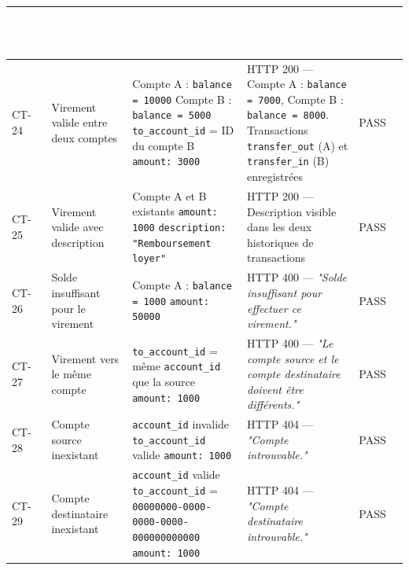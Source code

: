 \documentclass[12pt,a4paper,landscape]{article}
\begin{document}
\begin{longtable}{|L{2cm}|L{5cm}|L{6.5cm}|L{5cm}|L{2.5cm}|}
\hline
{}
\textbf{\textcolor{white}{Test Case ID}} &
\textbf{\textcolor{white}{Test Case Description}} &
\textbf{\textcolor{white}{Test Input (Test Case Value)}} &
\textbf{\textcolor{white}{Expected Results}} &
\textbf{\textcolor{white}{Test Case Status}} \\
\hline
CT-24 &
Virement valide entre deux comptes &
Compte A : \texttt{balance = 10000} \newline Compte B : \texttt{balance = 5000} \newline \texttt{to\_account\_id} = ID du compte B \newline \texttt{amount: 3000} &
HTTP 200 — Compte A : \texttt{balance = 7000}, Compte B : \texttt{balance = 8000}. \newline Transactions \texttt{transfer\_out} (A) et \texttt{transfer\_in} (B) enregistrées &
PASS \\
\hline
{}
CT-25 &
Virement valide avec description &
Compte A et B existants \newline \texttt{amount: 1000} \newline \texttt{description: "Remboursement loyer"} &
HTTP 200 — Description visible dans les deux historiques de transactions &
PASS \\
\hline
CT-26 &
Solde insuffisant pour le virement &
Compte A : \texttt{balance = 1000} \newline \texttt{amount: 50000} &
HTTP 400 — \textit{"Solde insuffisant pour effectuer ce virement."} &
PASS \\
\hline
{}
CT-27 &
Virement vers le même compte &
\texttt{to\_account\_id} = même \texttt{account\_id} que la source \newline \texttt{amount: 1000} &
HTTP 400 — \textit{"Le compte source et le compte destinataire doivent être différents."} &
PASS \\
\hline
CT-28 &
Compte source inexistant &
\texttt{account\_id} invalide \newline \texttt{to\_account\_id} valide \newline \texttt{amount: 1000} &
HTTP 404 — \textit{"Compte introuvable."} &
PASS \\
\hline
{}
CT-29 &
Compte destinataire inexistant &
\texttt{account\_id} valide \newline \texttt{to\_account\_id} = \texttt{00000000-0000-0000-0000-000000000000} \newline \texttt{amount: 1000} &
HTTP 404 — \textit{"Compte destinataire introuvable."} &
PASS \\
\hline
\end{longtable}
\end{document}
